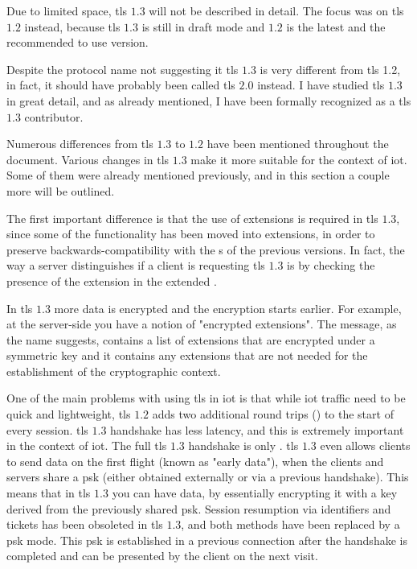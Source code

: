 \documentclass{llncs}
\begin{document}
Due to limited space, \gls{tls} $1.3$\cite{I-D.ietf-tls-tls13} will not be described in detail. The focus was on \gls{tls} $1.2$ instead, because \gls{tls} $1.3$ is still in draft
mode and $1.2$ is the latest and the recommended to use version.

Despite the protocol name not suggesting it \gls{tls} $1.3$ is
very different from \gls{tls} 1.2, in fact, it should have probably been called
\gls{tls} $2.0$ instead. I have studied \gls{tls} $1.3$ in great detail, and as already mentioned,
I have been formally recognized as a \gls{tls} $1.3$ contributor.

Numerous differences from \gls{tls} $1.3$ to $1.2$ have been mentioned throughout the document.
Various changes in \gls{tls} $1.3$ make it more suitable for the context
of \gls{iot}. Some of them were already mentioned previously, and in this section a couple more will be outlined.

The first important difference is that the use of extensions is required in \gls{tls} $1.3$,
since some of the functionality has been moved into extensions, in order to preserve
backwards-compatibility with the s of the previous versions.
In fact, the way a server distinguishes if a client is requesting \gls{tls} $1.3$
is by checking the presence of the  extension in the
extended .

In \gls{tls} $1.3$ more data is encrypted and the encryption starts earlier. For example,
at the server-side you have a notion of "encrypted extensions". The 
message, as the name suggests, contains a list of extensions that are encrypted
under a symmetric key and it contains any extensions that are not needed
for the establishment of the cryptographic context.

One of the main problems with using \gls{tls} in \gls{iot} is that while \gls{iot}
traffic need to be quick and lightweight, \gls{tls} $1.2$ adds two additional
round trips () to the start of every session. \gls{tls} $1.3$ handshake has less latency,
and this is extremely important in the context of \gls{iot}.
The full \gls{tls} $1.3$ handshake is only . \gls{tls} $1.3$ even allows
clients to send data on the first flight (known as "early data"), when the clients
and servers share a \gls{psk} (either obtained externally or via a previous handshake).
This means that in \gls{tls} $1.3$ you can have  data, by essentially
encrypting it with a key derived from the previously shared \gls{psk}. Session resumption
via identifiers and tickets has been obsoleted in \gls{tls} $1.3$, and both methods
have been replaced by a \gls{psk} mode. This \gls{psk} is established in a previous
connection after the handshake is completed and can be presented by the client
on the next visit.
\end{document}
